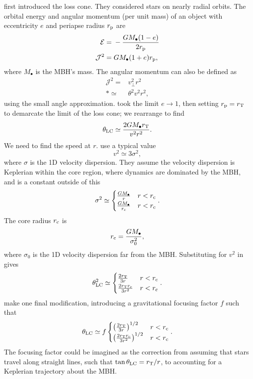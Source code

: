 \citet{Frank1976} first introduced the loss cone. They considered stars on nearly radial orbits. The orbital energy and angular momentum (per unit mass) of an object with eccentricity $e$ and periapse radius $r_\mathrm{p}$ are
\begin{align}
\mathcal{E} = {} & -\frac{GM_\bullet(1 - e)}{2r_\mathrm{p}} \\
\mathcal{J}^2 = {} & GM_\bullet(1 + e)r_\mathrm{p},
\end{align}
where $M_\bullet$ is the MBH's mass. The angular momentum can also be defined as
\begin{align}
\mathcal{J}^2 = {} & v_\perp^2r^2 \nonumber \\*
 \simeq {} & \theta^2v^2r^2,
\end{align}
using the small angle approximation. \citet{Frank1976} took the limit $e \rightarrow 1$, then setting $r_\mathrm{p} = r_\mathrm{T}$ to demarcate the limit of the loss cone; we rearrange to find
\begin{equation}
\theta_\mathrm{LC} \simeq \frac{2GM_\bullet r_\mathrm{T}}{v^2r^2}.
\label{eq:LC-FR}
\end{equation}
We need to find the speed at $r$. \citet{Frank1976} use a typical value
\begin{equation}
v^2 \simeq 3\sigma^2,
\end{equation}
where $\sigma$ is the 1D velocity dispersion. They assume the velocity dispersion is Keplerian within the core region, where dynamics are dominated by the MBH, and is a constant outside of this
\begin{equation}
\sigma^2 \simeq \begin{cases}
\frac{GM_\bullet}{r} & r < r_\mathrm{c} \\
\frac{GM_\bullet}{r_\mathrm{c}} & r < r_\mathrm{c}
\end{cases}.
\end{equation}
The core radius $r_\mathrm{c}$ is
\begin{equation}
r_\mathrm{c} = \frac{GM_\bullet}{\sigma_0^2},
\end{equation}
where $\sigma_0$ is the 1D velocity dispersion far from the MBH. Substituting for $v^2$ in  gives
\begin{align}
\theta_\mathrm{LC}^2 \simeq \begin{cases}
\frac{2r_\mathrm{T}}{3r} & r < r_\mathrm{c} \\
\frac{2r_\mathrm{T}r_\mathrm{c}}{3r^2} & r < r_\mathrm{c}
\end{cases}.
\label{eq:FR-LC}
\end{align}
\citet{Frank1976} make one final modification, introducing a gravitational focusing factor $f$ such that
\begin{align}
\theta_\mathrm{LC} \simeq f\begin{cases}
\left(\frac{2r_\mathrm{T}}{3r}\right)^{1/2} & r < r_\mathrm{c} \\
\left(\frac{2r_\mathrm{T}r_\mathrm{c}}{3r^2}\right)^{1/2} & r < r_\mathrm{c}
\end{cases}.
\end{align}
The focusing factor could be imagined as the correction from assuming that stars travel along straight lines, such that $\tan\theta_\mathrm{LC} = r_\mathrm{T}/r$, to accounting for a Keplerian trajectory about the MBH.

